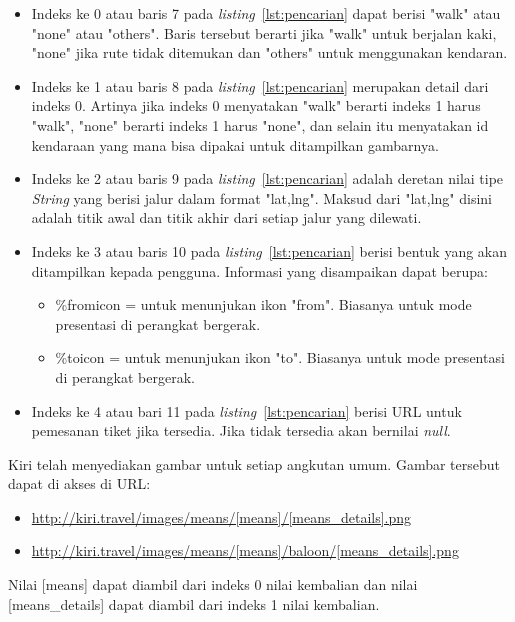 \begin{itemize}
	\item Indeks ke 0 atau baris 7 pada \textit{listing}~\ref{lst:pencarian} dapat berisi "walk" atau "none" atau "others". Baris tersebut berarti jika "walk" untuk berjalan kaki, "none" jika rute tidak ditemukan dan "others" untuk menggunakan kendaran.
	\item Indeks ke 1 atau baris 8 pada \textit{listing}~\ref{lst:pencarian} merupakan detail dari indeks 0. Artinya jika indeks 0 menyatakan "walk" berarti indeks 1 harus "walk", "none" berarti indeks 1 harus "none", dan selain itu menyatakan id kendaraan yang mana bisa dipakai untuk ditampilkan gambarnya.
	\item Indeks ke 2 atau baris 9 pada \textit{listing}~\ref{lst:pencarian} adalah deretan nilai tipe \textit{String} yang berisi jalur dalam format "lat,lng". Maksud dari "lat,lng" disini adalah titik awal dan titik akhir dari setiap jalur yang dilewati.
	\item Indeks ke 3 atau baris 10 pada \textit{listing}~\ref{lst:pencarian} berisi bentuk yang akan ditampilkan kepada pengguna. Informasi yang disampaikan dapat berupa:
		\begin{itemize}
			\item \%fromicon = untuk menunjukan ikon "from". Biasanya untuk mode presentasi di perangkat bergerak.
			\item \%toicon = untuk menunjukan ikon "to". Biasanya untuk mode presentasi di perangkat bergerak. 
		\end{itemize}
	\item Indeks ke 4 atau bari 11 pada \textit{listing}~\ref{lst:pencarian} berisi URL untuk pemesanan tiket jika tersedia. Jika tidak tersedia akan bernilai \textit{null}.
\end{itemize}

\hspace{0.5cm} Kiri telah menyediakan gambar untuk setiap angkutan umum. Gambar tersebut dapat di akses di URL:
\begin{itemize}
	\item \url{http://kiri.travel/images/means/[means]/[means_details].png}
	\item \url{http://kiri.travel/images/means/[means]/baloon/[means_details].png}
\end{itemize}
Nilai [means] dapat diambil dari indeks 0 nilai kembalian dan nilai [means\_details] dapat diambil dari indeks 1 nilai kembalian. 
		
